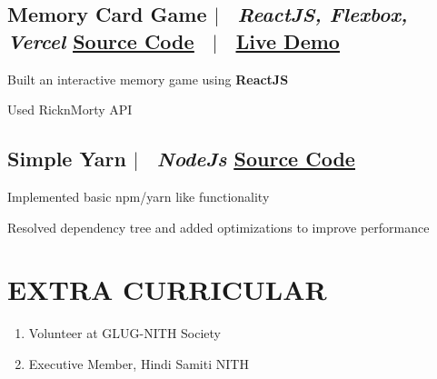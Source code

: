 \documentclass[11pt]{article}
\begin{document}
\subsection*{
  Memory Card Game 
  $|$ 
  \normalsize \normalfont \ \textit{ReactJS, Flexbox, Vercel }
  \hfill
  \normalsize \underline{\href{https://github.com/memory_card_game}{Source Code}}
  \ $|$ \ 
  \normalsize \underline{\href{https://harsh-sheth.github.io/memory_card_game}{Live Demo}}
}
  \begin{description}
    \setlength{\itemsep}{0em}
    \setlength{\itemindent}{2\parindent}
    \item[$\bullet$]{Built an interactive memory game using \textbf{ReactJS}}
    \item[$\bullet$]{Used RicknMorty API}
  \end{description}

\subsection*{
  Simple Yarn
  $|$ 
  \normalsize \normalfont \ \textit{NodeJs}
  \hfill 
  \normalsize \underline{\href{https://github.com/HARSH-SHETH/simple$_$yarn}{Source Code}}
}
  \begin{description}
    \setlength{\itemsep}{0em}
    \setlength{\itemindent}{2\parindent}
    \item[$\bullet$]{Implemented basic npm/yarn like functionality}
    \item[$\bullet$]{Resolved dependency tree and added optimizations to improve performance} 
  \end{description}



\section{EXTRA CURRICULAR}
\begin{enumerate}
  \setlength{\itemsep}{0em}
  \item Volunteer at GLUG-NITH Society
  \item Executive Member, Hindi Samiti NITH
\end{enumerate}
\end{document}
